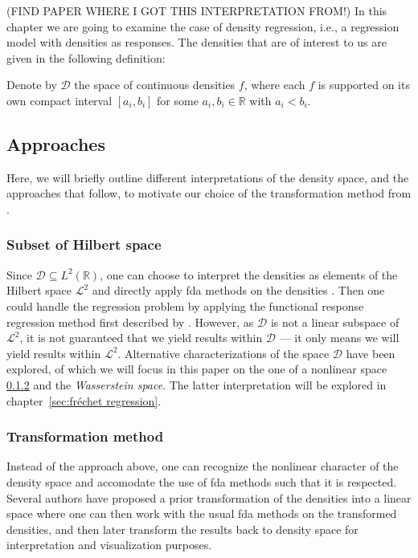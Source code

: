 (FIND PAPER WHERE I GOT THIS INTERPRETATION FROM!)
In this chapter we are going to examine the case of density regression, i.e., a
regression model with densities as responses. The densities that are of interest to
us are given in the following definition:

\begin{definition}
    Denote by $\mathcal{D}$ the space of continuous densities $f$, where each
    $f$ is supported on its own compact interval $[a_i, b_i]$ for some $a_i, b_i \in
    \mathbb{R}$ with $a_i < b_i$.
\end{definition}

\subsection{Approaches}
\label{sec:approaches}
Here, we will briefly outline different interpretations of the density space, and the
approaches that follow, to motivate our choice of the transformation method from
\textcites{PetersenMüller2016}{KokoszkaEtAl2019}.

\subsubsection{Subset of Hilbert space}
\label{sec:l2_interpretation}
Since $\mathcal{D} \subseteq L^2(\mathbb{R})$,
one can choose to interpret the densities as elements of
the Hilbert space $\mathcal{L}^2$ and directly apply fda methods on the densities
\parencite[see e.g.][]{KneipUtikal2001}. Then one could handle the regression problem by
applying the functional response regression method first described by \textcite{Faraway1997}.
However, as $\mathcal{D}$ is not a linear subspace of $\mathcal{L}^2$, it is not guaranteed that
we yield results within $\mathcal{D}$ --- it only means we will yield results within $\mathcal{L}^2$.
Alternative characterizations of the space $\mathcal{D}$ have been explored, of which
we will focus in this paper on the one of a nonlinear space \ref{sec:transformation_interpretation}
and the \textit{Wasserstein space}. The latter interpretation will be explored in
chapter~\ref{sec:fréchet regression}.

\subsubsection{Transformation method}
\label{sec:transformation_interpretation}
Instead of the approach above, one can recognize the nonlinear character of the density
space and accomodate the use of fda methods such that it is respected. Several authors
have proposed a prior transformation of the densities into a linear space
\parencites[e.g.][]{Hron2016}[][]{PetersenMüller2016} where one can then work with the
usual fda methods on the transformed densities, and then later transform the results
back to density space for interpretation and visualization purposes.

